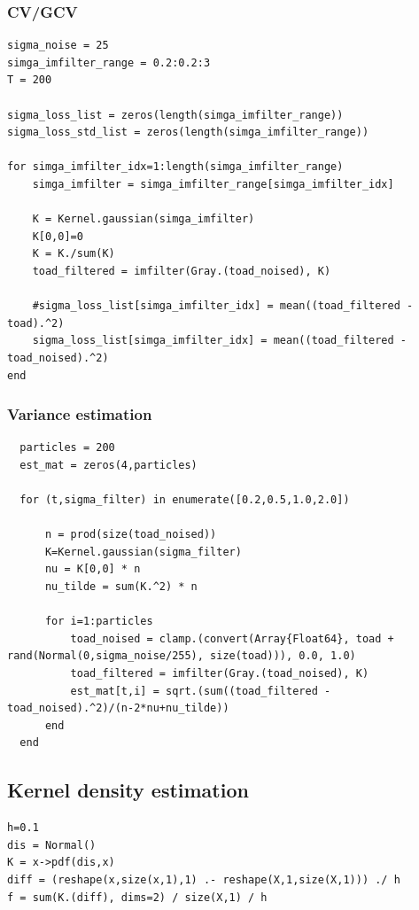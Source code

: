 \documentclass{article}
\begin{document}
\subsubsection{CV/GCV}

\begin{lstlisting}
sigma_noise = 25
simga_imfilter_range = 0.2:0.2:3
T = 200

sigma_loss_list = zeros(length(simga_imfilter_range))
sigma_loss_std_list = zeros(length(simga_imfilter_range))

for simga_imfilter_idx=1:length(simga_imfilter_range)
    simga_imfilter = simga_imfilter_range[simga_imfilter_idx]
    
    K = Kernel.gaussian(simga_imfilter)
    K[0,0]=0
    K = K./sum(K)
    toad_filtered = imfilter(Gray.(toad_noised), K)
    
    #sigma_loss_list[simga_imfilter_idx] = mean((toad_filtered - toad).^2)
    sigma_loss_list[simga_imfilter_idx] = mean((toad_filtered - toad_noised).^2)
end

\end{lstlisting}

\subsubsection{Variance estimation}

\begin{lstlisting}
  particles = 200
  est_mat = zeros(4,particles)
  
  for (t,sigma_filter) in enumerate([0.2,0.5,1.0,2.0])
      
      n = prod(size(toad_noised))
      K=Kernel.gaussian(sigma_filter)
      nu = K[0,0] * n
      nu_tilde = sum(K.^2) * n
      
      for i=1:particles
          toad_noised = clamp.(convert(Array{Float64}, toad + rand(Normal(0,sigma_noise/255), size(toad))), 0.0, 1.0)
          toad_filtered = imfilter(Gray.(toad_noised), K)
          est_mat[t,i] = sqrt.(sum((toad_filtered - toad_noised).^2)/(n-2*nu+nu_tilde))
      end
  end

\end{lstlisting}

\subsection{Kernel density estimation}

\begin{lstlisting}
h=0.1
dis = Normal()
K = x->pdf(dis,x)
diff = (reshape(x,size(x,1),1) .- reshape(X,1,size(X,1))) ./ h
f = sum(K.(diff), dims=2) / size(X,1) / h
\end{lstlisting}
\end{document}
